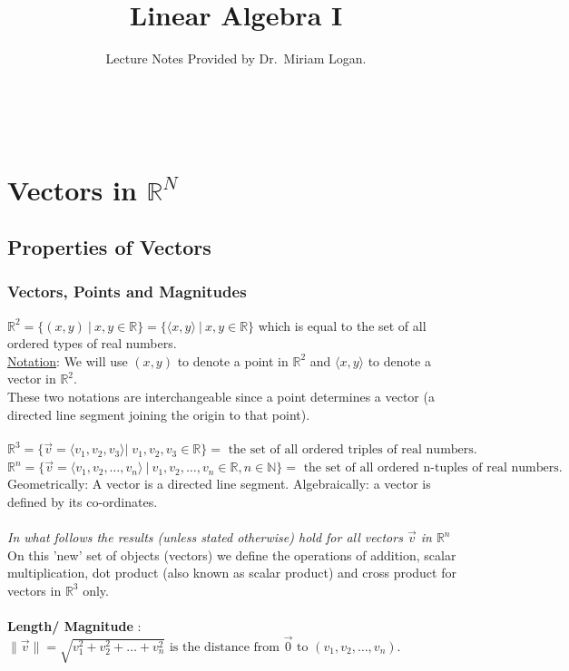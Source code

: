 \documentclass{report}
\begin{document}
\title{Linear Algebra I}
\author{Lecture Notes Provided by Dr.~Miriam Logan.}
\date{}
\maketitle
\tableofcontents
\newpage
\\
\section{Vectors in $\mathbb{R}^{N}$}
\subsection{Properties of Vectors}
\subsubsection{Vectors, Points and Magnitudes}
$\mathbb{R}^2 = \{ \left( x,y \right) ~|~x,y \in \mathbb{R}  \} = \{ \langle x , y\rangle~| ~x,y \in \mathbb{R}  \}  $ which is equal to the set of all ordered types of real numbers.\\
\underline{Notation}: We will use $\left( x,y \right) $ to denote a point in $\mathbb{R}^2$ and $\langle x ,y \rangle $ to denote a vector in $\mathbb{R}^2$.\\
These two notations are interchangeable since a point determines a vector (a directed line segment joining the origin to that point).\\
\\
\[
\mathbb{R}^{3} = \{ \vec{v} = \langle  v_1,v_2,v_3 \rangle |_{}^{} ~v_1, v_2, v_3 \in \mathbb{R} \} = \text{ the set of all ordered triples of real numbers}
.\] 
\[
\mathbb{R}^{n}= \{ \vec{v} = \langle v_1,v_2,\ldots,v_n  \rangle ~|~ v_1,v_2,\ldots,v_n \in \mathbb{R}, n \in \mathbb{N} \} = \text{ the set of all ordered n-tuples of real numbers}
.\] Geometrically: A vector is a directed line segment. Algebraically: a vector is defined by its co-ordinates.\\
\\
\textit{In what follows the results (unless stated otherwise) hold for all vectors $\vec{v} $ in $\mathbb{R}^{n}$}\\
On this 'new' set of objects (vectors) we define the operations of addition, scalar multiplication, dot product (also known as scalar product) and cross product for vectors in $\mathbb{R}^{3}$ only.\\
\\
\textbf{ Length/ Magnitude} : $\|\vec{v} \|= \sqrt{v_1^2+v_2^2+\ldots+v_n^2}  \text{ is the distance from $\vec{0} $ to } \left( v_1,v_2,\ldots,v_n \right) $.\\
\\
\end{document}
